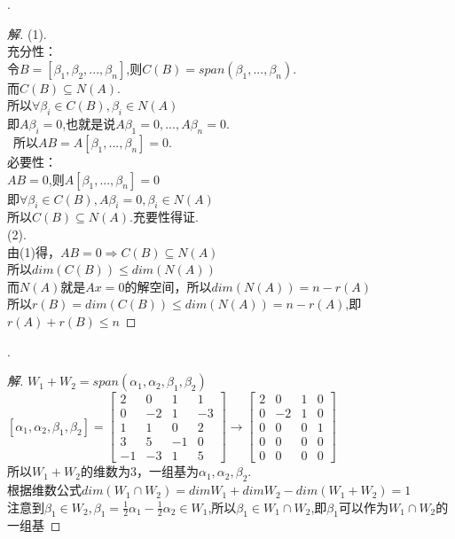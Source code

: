 \documentclass[10pt,a4paper]{report}
\begin{document}
.
\begin{proof}[解]
	(1).\\
	充分性：\\
	令$B=[\beta_{1}, \beta_{2},...,\beta_{n}]$,则$C(B) = span(\beta_{1},...,\beta_{n})$.\\
	而$C(B) \subseteq N(A)$.\\
	所以$\forall \beta_{i} \in C(B), \beta_{i} \in N(A)$\\
	即$A\beta_{i} = 0$,也就是说$A\beta_{1} = 0,..., A\beta_{n} = 0$.\\\
	所以$AB=A[\beta_{1},...,\beta_{n}] = 0$.\\
	必要性：\\
	$AB=0$,则$A[\beta_{1},...,\beta_{n}] = 0$\\
	即$\forall \beta_{i} \in C(B), A\beta_{i} = 0, \beta_{i} \in N(A)$\\
	所以$C(B) \subseteq N(A)$.充要性得证.\\
	(2).\\
	由(1)得，$AB=0 \Rightarrow C(B) \subseteq N(A)$\\
	所以$dim(C(B)) \leq dim(N(A))$\\
	而$N(A)$就是$Ax=0$的解空间，所以$dim (N(A)) = n - r(A)$\\
	所以$r(B) = dim (C(B)) \leq dim(N(A)) = n- r(A)$,即$r(A)+r(B) \leq n$
\end{proof}
.
\begin{proof}[解]
	$W_{1}+W_{2} = span(\alpha_{1}, \alpha_{2}, \beta_{1}, \beta_{2})$\\
	$[\alpha_{1}, \alpha_{2}, \beta_{1}, \beta_{2}] = \left[
	\begin{matrix}
	2 & 0 & 1 & 1\\
	0 & -2 & 1 & -3\\
	1 & 1 & 0 & 2\\
	3 & 5 & -1 & 0\\
	-1 & -3 & 1 & 5
	\end{matrix}
	\right] \rightarrow \left[
	\begin{matrix}
	2 & 0 & 1 & 0\\
	0 & -2 & 1 & 0\\
	0 & 0 & 0 & 1\\
	0 & 0 & 0 & 0\\
	0 & 0 & 0 & 0
	\end{matrix}
	\right]$\\
	所以$W_{1}+W_{2}$的维数为3，一组基为$\alpha_{1},\alpha_{2},\beta_{2}$.\\
	根据维数公式$dim (W_{1} \cap W_{2}) = dim W_{1} + dim W_{2} - dim (W_{1}+W_{2}) = 1$\\
	注意到$\beta_{1} \in W_{2}, \beta_{1} = \frac{1}{2}\alpha_{1} - \frac{1}{2}\alpha_{2} \in W_{1}$,所以$\beta_{1} \in W_{1} \cap W_{2}$,即$\beta_{1}$可以作为$W_{1} \cap W_{2}$的一组基
\end{proof}
\end{document}
